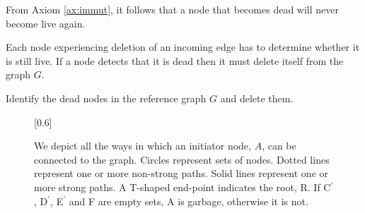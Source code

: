 From Axiom \ref{ax:immut}, it follows that a node that becomes dead will never
become live again.

Each node experiencing deletion of an incoming edge has to determine whether it is still
live. If a node detects that it is dead then it must delete itself from the
graph $G$. %

\begin{definition}
Identify the dead nodes in the reference graph $G$ and delete them.
\end{definition}



\begin{figure}
\centering
\scalebox{0.6}[0.6]{}
\caption{We depict all the ways in which an initiator node, $A$, can
be connected to the graph. Circles 
represent sets of nodes.
Dotted lines represent one or more non-strong paths. Solid lines represent one or more
strong paths.
A T-shaped end-point indicates the root, R.
If C${}^\prime$, D${}^\prime$, E${}^\prime$ and F are empty sets, A is garbage, otherwise 
it is not. }
\label{fig:completeabstract}
\end{figure}

